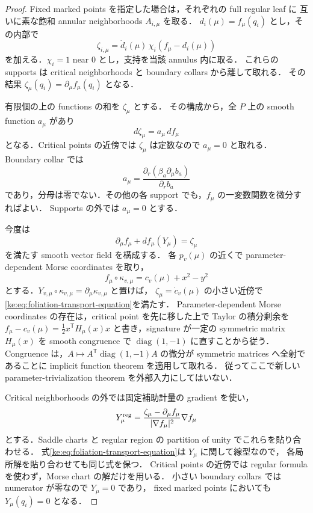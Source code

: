 \begin{proof}
Fixed marked points を指定した場合は，それぞれの full regular leaf に
互いに素な飽和 annular neighborhoods $A_{i,\mu}$ を取る．
$d_i(\mu)=f_\mu(q_i)$ とし，その内部で
\[
 \zeta_{i,\mu}=\dot d_i(\mu)\,\chi_i(f_\mu-d_i(\mu))
\]
を加える．$\chi_i=1$ near $0$ とし，支持を当該 annulus 内に取る．
これらの supports は critical neighborhoods と boundary collars から離して取れる．
その結果 $\zeta_\mu(q_i)=\partial_\mu f_\mu(q_i)$ となる．

有限個の上の functions の和を $\zeta_\mu$ とする．
その構成から，全 $P$ 上の smooth function $a_\mu$ があり
\begin{equation}\label{ke:eq:basic-critical-velocity}
 d\zeta_\mu=a_\mu\,df_\mu
\end{equation}
となる．Critical points の近傍では $\zeta_\mu$ は定数なので $a_\mu=0$ と取れる．
Boundary collar では
\[
 a_\mu=
 \frac{\partial_r(\beta_a\partial_\mu b_a)}{\partial_rb_a}
\]
であり，分母は零でない．その他の各 support でも，$f_\mu$ の一変数関数を微分すればよい．
Supports の外では $a_\mu=0$ とする．

今度は
\begin{equation}\label{ke:eq:foliation-transport-equation}
 \partial_\mu f_\mu+df_\mu(Y_\mu)=\zeta_\mu
\end{equation}
を満たす smooth vector field を構成する．
各 $p_v(\mu)$ の近くで parameter-dependent Morse coordinates を取り，
\[
 f_\mu\circ\kappa_{v,\mu}=c_v(\mu)+x^2-y^2
\]
とする．$Y_{v,\mu}\circ\kappa_{v,\mu}=\partial_\mu\kappa_{v,\mu}$ と置けば，
$\zeta_\mu=\dot c_v(\mu)$ の小さい近傍で
\eqref{ke:eq:foliation-transport-equation}を満たす．
Parameter-dependent Morse coordinates の存在は，critical point を先に移した上で
Taylor の積分剰余を
$f_\mu-c_v(\mu)=\tfrac12 x^{\mathsf T}H_\mu(x)x$
と書き，signature が一定の symmetric matrix $H_\mu(x)$ を smooth congruence で
$\operatorname{diag}(1,-1)$ に直すことから従う．
Congruence は，$A\mapsto A^{\mathsf T}\operatorname{diag}(1,-1)A$ の微分が
symmetric matrices へ全射であることに implicit function theorem を適用して取れる．
従ってここで新しい parameter-trivialization theorem を外部入力にしてはいない．

Critical neighborhoods の外では固定補助計量の gradient を使い，
\[
 Y^{\rm reg}_\mu
   =\frac{\zeta_\mu-\partial_\mu f_\mu}{|\nabla f_\mu|^2}\nabla f_\mu
\]
とする．Saddle charts と regular region の partition of unity でこれらを貼り合わせる．
式\eqref{ke:eq:foliation-transport-equation}は $Y_\mu$ に関して線型なので，
各局所解を貼り合わせても同じ式を保つ．
Critical points の近傍では regular formula を使わず，Morse chart の解だけを用いる．
小さい boundary collars では numerator が零なので $Y_\mu=0$ であり，
fixed marked points においても $Y_\mu(q_i)=0$ となる．


\end{proof}
